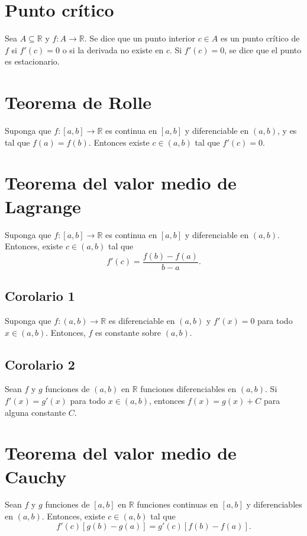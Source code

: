 \documentclass{article}
\begin{document}
\section*{Punto crítico}

Sea $A\subseteq \mathbb{R}$ y $f:A\to \mathbb{R}$. Se dice que un punto interior $c\in A$ es un punto crítico de $f$ si $f'(c)=0$ o si la derivada no existe en $c$. Si $f'(c)=0$, se dice que el punto es estacionario.

\section*{Teorema de Rolle}

Suponga que $f:[a,b]\to\mathbb{R}$ es continua en $[a,b]$ y diferenciable en $(a,b)$, y es tal que $f(a)=f(b)$. Entonces existe $c\in(a,b)$ tal que $f'(c)=0$.

\section*{Teorema del valor medio de Lagrange}

Suponga que $f:[a,b]\to\mathbb{R}$ es continua en $[a,b]$ y diferenciable en $(a,b)$. Entonces, existe $c\in(a,b)$ tal que
$$f'(c)=\frac{f(b)-f(a)}{b-a}.$$

\subsection*{Corolario 1}

Suponga que $f:(a,b)\to\mathbb{R}$ es diferenciable en $(a,b)$ y $f'(x)=0$ para todo $x\in(a,b)$. Entonces, $f$ es constante sobre $(a,b)$.

\subsection*{Corolario 2}

Sean $f$ y $g$ funciones de $(a,b)$ en $\mathbb{R}$ funciones diferenciables en $(a,b)$. Si $f'(x)=g'(x)$ para todo $x\in(a,b)$, entonces $f(x)=g(x)+C$ para alguna constante $C$.

\section*{Teorema del valor medio de Cauchy}

Sean $f$ y $g$ funciones de $[a,b]$ en $\mathbb{R}$ funciones continuas en $[a,b]$ y diferenciables en $(a,b)$. Entonces, existe $c\in(a,b)$ tal que
$$f'(c)[g(b)-g(a)]=g'(c)[f(b)-f(a)].$$
\end{document}
